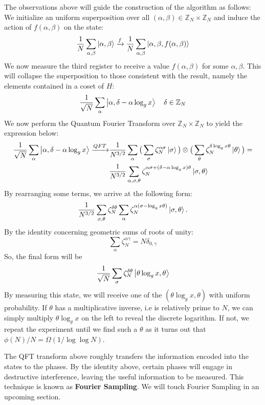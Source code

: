 \documentclass{../quantum.tex}
\begin{document}
The observations above will guide the construction of the algorithm as follows: We initialize an uniform superposition over all $(\alpha,\beta) \in \mathbb{Z}_N \times \mathbb{Z}_N $ and induce the action of $f(\alpha, \beta)$ on the state:
%
\begin{gather}
  \frac{1}{N} \sum_{\alpha,\beta} \ket{\alpha, \beta} \xrightarrow{f} \frac{1}{N} \sum_{\alpha,\beta} \ket{\alpha, \beta, f(\alpha, \beta)}
\end{gather}
%
We now measure the third register to receive a value $f(\alpha,\beta)$ for some $\alpha,\beta$. This will collapse the superposition to those consistent with the result, namely the elements contained in a coset of $H$:
%
\begin{equation}
  \frac{1}{\sqrt{N}} \sum_{\alpha} \ket{\alpha,\delta - \alpha\log_g{x}} \quad \delta \in \mathbb{Z}_N
\end{equation}
%
We now perform the Quantum Fourier Transform over $\mathbb{Z}_N \times \mathbb{Z}_N$ to yield the expression below:
%
\begin{gather}
  \begin{split}
    \frac{1}{\sqrt{N}} \sum_{\alpha} \ket{\alpha,\delta - \alpha\log_g{x}} \xrightarrow{QFT}
    & \frac{1}{N^{3/2}} \sum_{\alpha} \big(\sum_{\sigma} \zeta_N^{\alpha\sigma} \ket{\sigma}\big) \otimes \big(\sum_{\theta} \zeta_N^{\delta\log_g{x}\theta} \ket{\theta} \big) = \\
    & \frac{1}{N^{3/2}}\sum_{\alpha,\sigma,\theta} \zeta_N^{\alpha\sigma + (\delta - \alpha\log_g{x})\theta} \ket{\sigma,\theta}
  \end{split}
\end{gather}
By rearranging some terms, we arrive at the following form:
%
\begin{gather}
\frac{1}{N^{3/2}}\sum_{\sigma,\theta} \zeta_N^{\delta\theta} \sum_{\alpha} \zeta_N^{\alpha(\sigma - \log_g{x}\theta)}\ket{\sigma,\theta}.
\end{gather}
%
By the identity concerning geometric sums of roots of unity:
$$ \sum_{\alpha} \zeta_N^{\alpha\gamma} = N \delta_{0,\gamma} $$
So, the final form will be
%
$$ \frac{1}{\sqrt{N}} \sum_{\sigma} \zeta_N^{\delta\theta} \ket{\theta\log_g{x},\theta} $$
By measuring this state, we will receive one of the $(\theta\log_g{x}, \theta)$ with uniform probability. If $\theta$ has a multiplicative inverse, i.e is relatively prime to $N$, we can simply multiply $\theta\log_g{x}$ on the left to reveal the discrete logarithm. If not, we repeat the experiment until we find such a $\theta$ as it turns out that $\phi(N) / N = \Omega(1/\log\log{N})$.
%
\begin{remark}
  The QFT transform above roughly transfers the information encoded into the states to the phases. By the identity above, certain phases will engage in destructive interference, leaving the useful information to be measured. This technique is known as {\bf Fourier Sampling}. We will touch Fourier Sampling in an upcoming section.
\end{remark}
\end{document}
